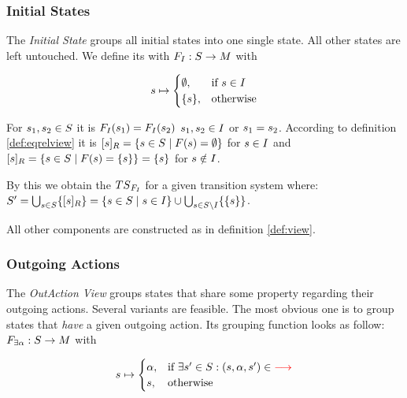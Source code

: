 \documentclass[preview]{standalone}
\begin{document}


\subsubsection{Initial States}
The \emph{Initial State \viewNC}  groups all initial states into one single state. All other states are left untouched.
We define its \grpfctN with ${F}_{I} : {S} \to {\ensuremath{{M}}}$ with 

\[
{s} \mapsto
\begin{cases}
	\emptyset,				& \text{if } {s} \in {I} \\
	\{{s}\},          	& \text{otherwise}
\end{cases}
\]

For ${s}_1,{s}_2 \in {S}$ it is ${{{{F}}_{I}}}({s}_1) = {{{{F}}_{I}}}({s}_2)$ \iffN ${s}_1, {s}_2 \in {I}$ or ${s}_1 = {s}_2$. According to definition \ref{def:eqrelview} it is ${{[{s}]_{{R}}}} = \{{s} \in {S} \mid {F}({s}) = \emptyset\}$ for ${s} \in {I}$ and ${{[{s}]_{{R}}}} = \{{s} \in {S} \mid {F}({s}) = \{{s}\} \} = \{{s}\}$ for ${s} \notin {I}$.

By this we obtain the \viewN ${{{TS}_{{{{F}}_{I}}}}}$ for a given transition system \ts where: ${S}' = \bigcup_{{s} \in {S}} \{{{[{s}]_{{R}}}}\} = \{{s} \in {S} \mid {s} \in {I}\}\cup \bigcup_{{s} \in {S} \setminus {I}}\{\{{s}\}\}$.

All other components are constructed as in definition \ref{def:view}.

\subsubsection{Outgoing Actions}
The \emph{OutAction View} groups states that share some property regarding their outgoing actions. Several variants are feasible. The most obvious one is to group states that \emph{have} a given outgoing action. Its grouping function looks as follow: ${F}_{\exists{\alpha}} : {S} \to {M}$ with 


\[
{s} \mapsto
\begin{cases}
	{\alpha},				& \text{if } \exists {s}' \in {S}: ({s}, {\alpha}, {s}') \in {\color{red}\ensuremath{{\longrightarrow}}} \\
	{s},          	& \text{otherwise}
\end{cases}
\]
\end{document}
